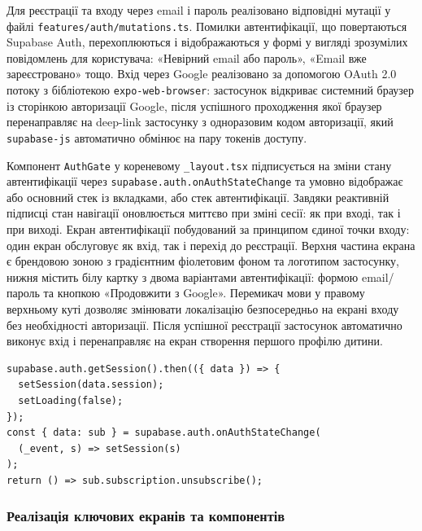 Для реєстрації та входу через email і пароль реалізовано відповідні мутації у файлі \texttt{features/auth/mutations.ts}. Помилки автентифікації, що повертаються Supabase Auth, перехоплюються і відображаються у формі у вигляді зрозумілих повідомлень для користувача: «Невірний email або пароль», «Email вже зареєстровано» тощо. Вхід через Google реалізовано за допомогою \gls{OAuth} 2.0 потоку з бібліотекою \texttt{expo-web-browser}: застосунок відкриває системний браузер із сторінкою авторизації Google, після успішного проходження якої браузер перенаправляє на deep-link застосунку з одноразовим кодом авторизації, який \texttt{supabase-js} автоматично обмінює на пару токенів доступу.

Компонент \texttt{AuthGate} у кореневому \texttt{\_layout.tsx} підписується на зміни стану автентифікації через \texttt{supabase.auth.onAuthStateChange} та умовно відображає або основний стек із вкладками, або стек автентифікації. Завдяки реактивній підписці стан навігації оновлюється миттєво при зміні сесії: як при вході, так і при виході. Екран автентифікації побудований за принципом єдиної точки входу: один екран обслуговує як вхід, так і перехід до реєстрації. Верхня частина екрана є брендовою зоною з градієнтним фіолетовим фоном та логотипом застосунку, нижня містить білу картку з двома варіантами автентифікації: формою email/пароль та кнопкою «Продовжити з Google». Перемикач мови у правому верхньому куті дозволяє змінювати локалізацію безпосередньо на екрані входу без необхідності авторизації. Після успішної реєстрації застосунок автоматично виконує вхід і перенаправляє на екран створення першого профілю дитини.

\begin{verbatim}
supabase.auth.getSession().then(({ data }) => {
  setSession(data.session);
  setLoading(false);
});
const { data: sub } = supabase.auth.onAuthStateChange(
  (_event, s) => setSession(s)
);
return () => sub.subscription.unsubscribe();
\end{verbatim}

\subsubsection{Реалізація ключових екранів та компонентів}

